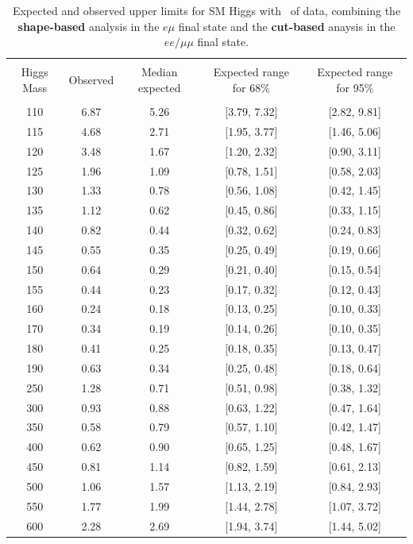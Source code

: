 \begin{table}[hbp!]
\begin{center}
\caption{Expected and observed upper limits for SM Higgs using the
  {\bf cut-based} analysis with \intlumiEightTeV\ of data.}
\label{tab:cutbase_uls}
\end{center}
\begin{center}
\begin{tabular}{c c c c c}
\hline
\vspace{-3mm} && \\
 Higgs Mass & Observed  & Median expected & Expected range for 68\% & Expected range for 95\%   \\
\vspace{-3mm} && \\
\hline
110 & 6.87 & 5.26 & [3.79, 7.32] & [2.82, 9.81] \\
115 & 4.68 & 2.71 & [1.95, 3.77] & [1.46, 5.06] \\
120 & 3.48 & 1.67 & [1.20, 2.32] & [0.90, 3.11] \\
125 & 1.96 & 1.09 & [0.78, 1.51] & [0.58, 2.03] \\
130 & 1.33 & 0.78 & [0.56, 1.08] & [0.42, 1.45] \\
135 & 1.12 & 0.62 & [0.45, 0.86] & [0.33, 1.15] \\
140 & 0.82 & 0.44 & [0.32, 0.62] & [0.24, 0.83] \\
145 & 0.55 & 0.35 & [0.25, 0.49] & [0.19, 0.66] \\
150 & 0.64 & 0.29 & [0.21, 0.40] & [0.15, 0.54] \\
155 & 0.44 & 0.23 & [0.17, 0.32] & [0.12, 0.43] \\
160 & 0.24 & 0.18 & [0.13, 0.25] & [0.10, 0.33] \\
170 & 0.34 & 0.19 & [0.14, 0.26] & [0.10, 0.35] \\
180 & 0.41 & 0.25 & [0.18, 0.35] & [0.13, 0.47] \\
190 & 0.63 & 0.34 & [0.25, 0.48] & [0.18, 0.64] \\
250 & 1.28 & 0.71 & [0.51, 0.98] & [0.38, 1.32] \\
300 & 0.93 & 0.88 & [0.63, 1.22] & [0.47, 1.64] \\
350 & 0.58 & 0.79 & [0.57, 1.10] & [0.42, 1.47] \\
400 & 0.62 & 0.90 & [0.65, 1.25] & [0.48, 1.67] \\
450 & 0.81 & 1.14 & [0.82, 1.59] & [0.61, 2.13] \\
500 & 1.06 & 1.57 & [1.13, 2.19] & [0.84, 2.93] \\
550 & 1.77 & 1.99 & [1.44, 2.78] & [1.07, 3.72] \\
600 & 2.28 & 2.69 & [1.94, 3.74] & [1.44, 5.02] \\
\hline
\end{tabular}
\caption{Expected and observed upper limits for SM Higgs with \intlumiEightTeV\ of data, 
  combining the {\bf shape-based} analysis in the $e\mu$ final state and the 
  {\bf cut-based} anaysis in the $ee/\mu\mu$ final state. }
\label{tab:mvabase_uls}
\end{center}
\end{table}

